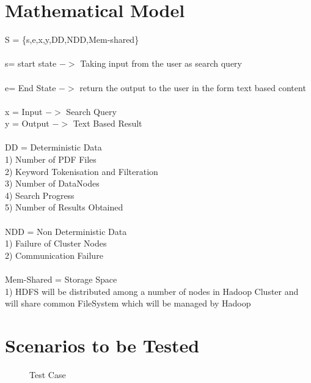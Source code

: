 \documentclass[oneside,a4paper,12pt]{report}
\begin{document}
{\begin{appendices}
\section{Mathematical Model}
\noindent
S = \{s,e,x,y,DD,NDD,Mem-shared\} \\ \\
s= start state $->$ Taking input from the user as search query\\ \\ e= End State $->$ return the output to the user in the form text based content \\ \\
x = Input $->$ Search Query \\
y = Output $->$ Text Based Result \\ \\ 
DD = Deterministic Data \\
1) Number of PDF Files \\ 
2) Keyword Tokenisation and Filteration \\
3) Number of DataNodes \\
4) Search Progress \\
5) Number of Results Obtained \\ \\
NDD = Non Deterministic Data \\
1) Failure of Cluster Nodes \\
2) Communication Failure  \\ \\
Mem-Shared = Storage Space \\ 
1) HDFS will be distributed among a number of nodes in Hadoop Cluster and will share common FileSystem which will be managed by Hadoop \\

\section{Scenarios to be Tested}

\begin{center}
	\begin{figure}[H]
		\centering
	  \caption{Test Case}
	  \label{fig:state-dig}
	\end{figure}
\end{center} 


\end{appendices}}
\end{document}
